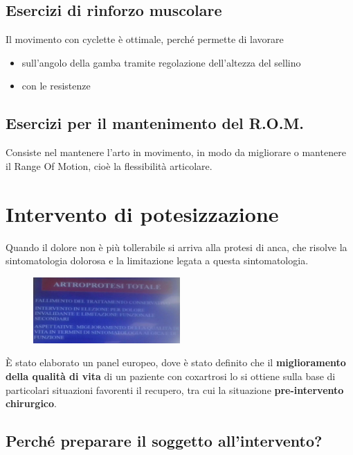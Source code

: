 \subsection{Esercizi di rinforzo muscolare}


Il movimento con cyclette è ottimale, perché permette di lavorare


\begin{itemize}
\item
  sull'angolo della gamba tramite regolazione dell'altezza del sellino
\item
  con le resistenze
\end{itemize}

\subsection{Esercizi per il mantenimento del R.O.M.}


Consiste nel mantenere l'arto in movimento, in modo da migliorare o
mantenere il Range Of Motion, cioè la flessibilità articolare.


\section{Intervento di potesizzazione}

Quando il dolore non è più tollerabile si arriva alla protesi di anca,
che risolve la sintomatologia dolorosa e la limitazione legata a questa
sintomatologia.
\begin{figure}[!ht]
\centering
	\includegraphics[width=0.5\textwidth]{031/image3.jpeg}
\end{figure}


È stato elaborato un panel europeo, dove è stato definito che il
\textbf{miglioramento della qualità di vita} di un paziente con
coxartrosi lo si ottiene sulla base di particolari situazioni favorenti
il recupero, tra cui la situazione \textbf{pre-intervento chirurgico}.


\subsection{Perché preparare il soggetto all'intervento?}


